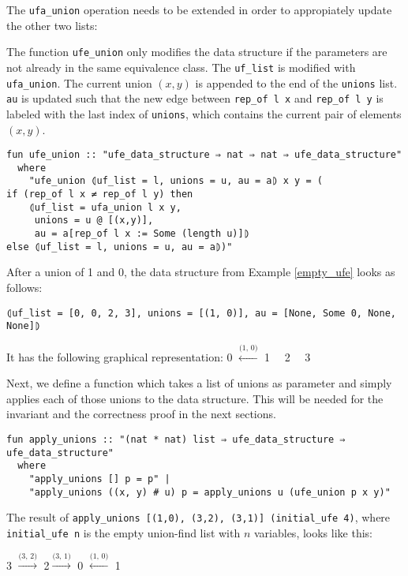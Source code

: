 The \lstinline{ufa_union} operation needs to be extended in order to appropiately update the other two lists:

The function \lstinline{ufe_union} only modifies the data structure if the parameters are not already in the same equivalence class.
The \lstinline{uf_list} is modified with \lstinline{ufa_union}.
The current union $(x, y)$ is appended to the end of the \lstinline{unions} list.
\lstinline{au} is updated such that the new edge between \lstinline{rep_of l x} and \lstinline{rep_of l y} is labeled with the last index of \lstinline{unions}, which contains the current pair of elements $(x, y)$.

\begin{lstlisting}
fun ufe_union :: "ufe_data_structure ⇒ nat ⇒ nat ⇒ ufe_data_structure"
  where
    "ufe_union ⦇uf_list = l, unions = u, au = a⦈ x y = (
if (rep_of l x ≠ rep_of l y) then
    ⦇uf_list = ufa_union l x y,
     unions = u @ [(x,y)],
     au = a[rep_of l x := Some (length u)]⦈
else ⦇uf_list = l, unions = u, au = a⦈)"
\end{lstlisting}

\begin{exmp}
After a union of 1 and 0, the data structure from Example \ref{empty_ufe} looks as follows:
\begin{lstlisting}
⦇uf_list = [0, 0, 2, 3], unions = [(1, 0)], au = [None, Some 0, None, None]⦈
\end{lstlisting}
It has the following graphical representation:
0 $\xleftarrow{\text{(1, 0)}}$ 1 \ \ 2 \ \ 3
\end{exmp}

Next, we define a function which takes a list of unions as parameter and simply applies each of those unions to the data structure. This will be needed for the invariant and the correctness proof in the next sections.

\begin{lstlisting}
fun apply_unions :: "(nat * nat) list ⇒ ufe_data_structure ⇒ ufe_data_structure"
  where
    "apply_unions [] p = p" |
    "apply_unions ((x, y) # u) p = apply_unions u (ufe_union p x y)"
\end{lstlisting}

\begin{exmp}\label{example:apply-unions}
The result of \lstinline|apply_unions [(1,0), (3,2), (3,1)] (initial_ufe 4)|, where \lstinline|initial_ufe n| is the empty union-find list with $n$ variables, looks like this:

3 $\xrightarrow{\text{(3, 2)}}$ 2$\xrightarrow{\text{(3, 1)}}$ 0 $\xleftarrow{\text{(1, 0)}}$ 1 \
\end{exmp}

